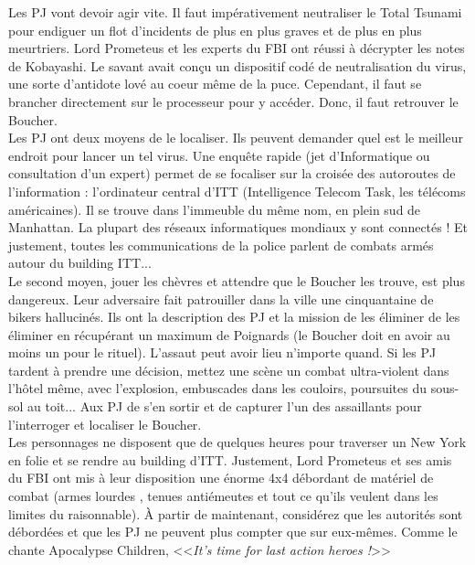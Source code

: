 \documentclass[11pt,twoside,a4paper]{book}
\begin{document}
Les PJ vont devoir agir vite. Il faut imp{\'e}rativement neutraliser le Total Tsunami pour endiguer un flot d'incidents de plus en plus graves et de plus en plus meurtriers. Lord Prometeus et les experts du FBI ont r{\'e}ussi {\`a} d{\'e}crypter les notes de Kobayashi. Le savant avait con\c{c}u un dispositif cod{\'e} de neutralisation du virus, une sorte d'antidote lov{\'e} au coeur m{\^e}me de la puce. Cependant, il faut se brancher directement sur le processeur pour y acc{\'e}der. Donc, il faut retrouver le Boucher.~\\

Les PJ ont deux moyens de le localiser. Ils peuvent demander quel est le meilleur endroit pour lancer un tel virus. Une enqu{\^e}te rapide (jet d'Informatique ou consultation d'un expert) permet de se focaliser sur la crois{\'e}e des autoroutes de l'information : l'ordinateur central d'ITT (Intelligence Telecom Task, les t{\'e}l{\'e}coms am{\'e}ricaines). Il se trouve dans l'immeuble du m{\^e}me nom, en plein sud de Manhattan. La plupart des r{\'e}seaux informatiques mondiaux y sont connect{\'e}s ! Et justement, toutes les communications de la police parlent de combats arm{\'e}s autour du building ITT...~\\

Le second moyen, jouer les ch{\`e}vres et attendre que le Boucher les trouve, est plus dangereux. Leur adversaire fait patrouiller dans la ville une cinquantaine de bikers hallucin{\'e}s. Ils ont la description des PJ et la mission de les {\'e}liminer de les {\'e}liminer en r{\'e}cup{\'e}rant un maximum de Poignards (le Boucher doit en avoir au moins un pour le rituel). L'assaut peut avoir lieu n'importe quand. Si les PJ tardent {\`a} prendre une d{\'e}cision, mettez une sc{\`e}ne un combat ultra-violent dans l'h{\^o}tel m{\^e}me, avec l'explosion, embuscades dans les couloirs, poursuites du sous-sol au toit... Aux PJ de s'en sortir et de capturer l'un des assaillants pour l'interroger et localiser le Boucher.~\\

Les personnages ne disposent que de quelques heures pour traverser un New York en folie et se rendre au building d'ITT. Justement, Lord Prometeus et ses amis du FBI ont mis {\`a} leur disposition une {\'e}norme 4x4 d{\'e}bordant de mat{\'e}riel de combat (armes lourdes , tenues anti{\'e}meutes et tout ce qu'ils veulent dans les limites du raisonnable). {\`A} partir de maintenant, consid{\'e}rez que les autorit{\'e}s sont d{\'e}bord{\'e}es et que les PJ ne peuvent plus compter que sur eux-m{\^e}mes. Comme le chante Apocalypse Children, <<\emph{It's time for last action heroes !}>>~\\
\end{document}
